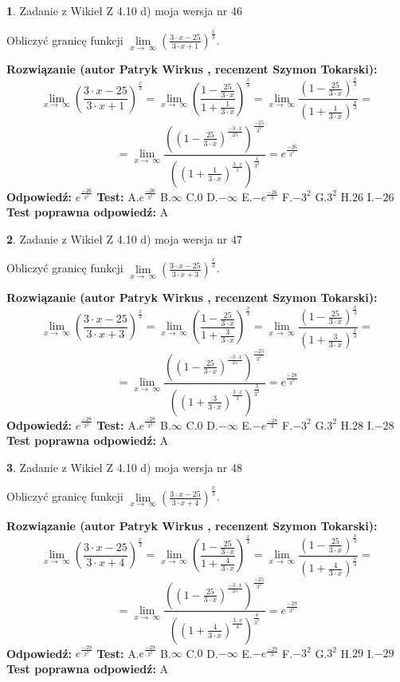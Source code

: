 \documentclass[12pt, a4paper]{article}
\theoremstyle{definition} %
\newtheorem{zad}{}
\newcommand{\zadStart}[1]{\begin{zad}#1\newline}
\newcommand{\zadStop}{\end{zad}}
\newcommand{\rozwStart}[2]{\noindent \textbf{Rozwiązanie (autor #1 , recenzent #2): }\newline}
\newcommand{\rozwStop}{\newline}
\newcommand{\odpStart}{\noindent \textbf{Odpowiedź:}\newline}
\newcommand{\odpStop}{\newline}
\newcommand{\testStart}{\noindent \textbf{Test:}\newline}
\newcommand{\testStop}{\newline}
\newcommand{\kluczStart}{\noindent \textbf{Test poprawna odpowiedź:}\newline}
\newcommand{\kluczStop}{\newline}
\begin{document}
\zadStart{Zadanie z Wikieł Z 4.10 d) moja wersja nr 46}


Obliczyć granicę funkcji  $\lim\limits_{x\to\ \infty}(\frac{3\cdot x-25}{3\cdot x+1})^{\frac{x}{3}}$.
\zadStop
\rozwStart{Patryk Wirkus}{Szymon Tokarski}
$$\lim\limits_{x\to\ \infty}(\frac{3\cdot x-25}{3\cdot x+1})^{\frac{x}{3}} = \lim\limits_{x\to\ \infty}(\frac{1-\frac{25}{3\cdot x}}{1+\frac{1}{3\cdot x}})^{\frac{x}{3}}=\lim\limits_{x\to\ \infty}\frac{(1-\frac{25}{3\cdot x})^{\frac{x}{3}}}{(1+\frac{1}{3\cdot x})^{\frac{x}{3}}}=$$
$$=\lim\limits_{x\to\ \infty}\frac{((1-\frac{25}{3\cdot x})^{\frac{-3\cdot x}{25}})^{\frac{-25}{3^{2}}}}{((1+\frac{1}{3\cdot x})^{\frac{3\cdot x}{1}})^{\frac{1}{3^{2}}}}=e^{\frac{-26}{3^{2}}}$$
\rozwStop
\odpStart
$e^{\frac{-26}{3^{2}}}$
\odpStop
\testStart
A.$e^{\frac{-26}{3^{2}}}$ B.$\infty$ C.$0$ D.$-\infty$ E.$-e^{\frac{-26}{3}}$
F.$-3^{2}$ G.$3^{2}$
H.$26$
I.$-26$
\testStop
\kluczStart
A
\kluczStop



\zadStart{Zadanie z Wikieł Z 4.10 d) moja wersja nr 47}


Obliczyć granicę funkcji  $\lim\limits_{x\to\ \infty}(\frac{3\cdot x-25}{3\cdot x+3})^{\frac{x}{3}}$.
\zadStop
\rozwStart{Patryk Wirkus}{Szymon Tokarski}
$$\lim\limits_{x\to\ \infty}(\frac{3\cdot x-25}{3\cdot x+3})^{\frac{x}{3}} = \lim\limits_{x\to\ \infty}(\frac{1-\frac{25}{3\cdot x}}{1+\frac{3}{3\cdot x}})^{\frac{x}{3}}=\lim\limits_{x\to\ \infty}\frac{(1-\frac{25}{3\cdot x})^{\frac{x}{3}}}{(1+\frac{3}{3\cdot x})^{\frac{x}{3}}}=$$
$$=\lim\limits_{x\to\ \infty}\frac{((1-\frac{25}{3\cdot x})^{\frac{-3\cdot x}{25}})^{\frac{-25}{3^{2}}}}{((1+\frac{3}{3\cdot x})^{\frac{3\cdot x}{3}})^{\frac{3}{3^{2}}}}=e^{\frac{-28}{3^{2}}}$$
\rozwStop
\odpStart
$e^{\frac{-28}{3^{2}}}$
\odpStop
\testStart
A.$e^{\frac{-28}{3^{2}}}$ B.$\infty$ C.$0$ D.$-\infty$ E.$-e^{\frac{-28}{3}}$
F.$-3^{2}$ G.$3^{2}$
H.$28$
I.$-28$
\testStop
\kluczStart
A
\kluczStop



\zadStart{Zadanie z Wikieł Z 4.10 d) moja wersja nr 48}


Obliczyć granicę funkcji  $\lim\limits_{x\to\ \infty}(\frac{3\cdot x-25}{3\cdot x+4})^{\frac{x}{3}}$.
\zadStop
\rozwStart{Patryk Wirkus}{Szymon Tokarski}
$$\lim\limits_{x\to\ \infty}(\frac{3\cdot x-25}{3\cdot x+4})^{\frac{x}{3}} = \lim\limits_{x\to\ \infty}(\frac{1-\frac{25}{3\cdot x}}{1+\frac{4}{3\cdot x}})^{\frac{x}{3}}=\lim\limits_{x\to\ \infty}\frac{(1-\frac{25}{3\cdot x})^{\frac{x}{3}}}{(1+\frac{4}{3\cdot x})^{\frac{x}{3}}}=$$
$$=\lim\limits_{x\to\ \infty}\frac{((1-\frac{25}{3\cdot x})^{\frac{-3\cdot x}{25}})^{\frac{-25}{3^{2}}}}{((1+\frac{4}{3\cdot x})^{\frac{3\cdot x}{4}})^{\frac{4}{3^{2}}}}=e^{\frac{-29}{3^{2}}}$$
\rozwStop
\odpStart
$e^{\frac{-29}{3^{2}}}$
\odpStop
\testStart
A.$e^{\frac{-29}{3^{2}}}$ B.$\infty$ C.$0$ D.$-\infty$ E.$-e^{\frac{-29}{3}}$
F.$-3^{2}$ G.$3^{2}$
H.$29$
I.$-29$
\testStop
\kluczStart
A
\kluczStop
\end{document}
